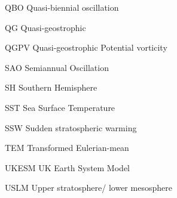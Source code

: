 \begin{description*}
\item[QBO] Quasi-biennial oscillation
\item[QG] Quasi-geostrophic
\item[QGPV] Quasi-geostrophic Potential vorticity
\item[SAO] Semiannual Oscillation
\item[SH] Southern Hemisphere
\item[SST] Sea Surface Temperature
\item[SSW] Sudden stratospheric warming
\item[TEM] Transformed Eulerian-mean
\item[UKESM] UK Earth System Model
\item[USLM] Upper stratosphere/ lower mesosphere



\end{description*}



